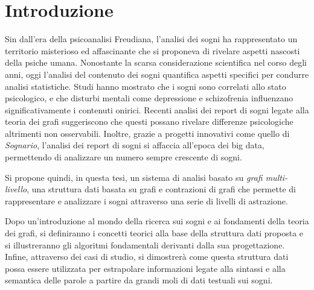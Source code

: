 \chapter*{Introduzione}

Sin dall'era della psicoanalisi Freudiana, l'analisi dei sogni ha rappresentato un territorio misterioso
ed affascinante che si proponeva di rivelare aspetti nascosti della psiche umana.
Nonostante la scarsa considerazione scientifica nel corso degli anni, oggi l'analisi del contenuto dei sogni
quantifica aspetti specifici per condurre analisi statistiche.
Studi hanno mostrato che i sogni sono correlati allo stato psicologico, e che disturbi mentali come depressione e
schizofrenia influenzano significativamente i contenuti onirici.
Recenti analisi dei report di sogni legate alla teoria dei grafi suggeriscono che questi possano rivelare differenze
psicologiche altrimenti non osservabili.
Inoltre, grazie a progetti innovativi come quello di \textit{Sognario}, l'analisi dei report di sogni si affaccia
all'epoca dei big data, permettendo di analizzare un numero sempre crescente di sogni.

Si propone quindi, in questa tesi, un sistema di analisi basato su \textit{grafi multi-livello},
una struttura dati basata su grafi e contrazioni di grafi che permette di rappresentare e analizzare i sogni attraverso
una serie di livelli di astrazione.

Dopo un'introduzione al mondo della ricerca sui sogni e ai fondamenti della teoria dei grafi,
si definiranno i concetti teorici alla base della struttura dati proposta e si illustreranno gli algoritmi
fondamentali derivanti dalla sua progettazione.
Infine, attraverso dei casi di studio, si dimostrerà come questa struttura dati possa essere utilizzata per
estrapolare informazioni legate alla sintassi e alla semantica delle parole a partire da
grandi moli di dati testuali sui sogni.